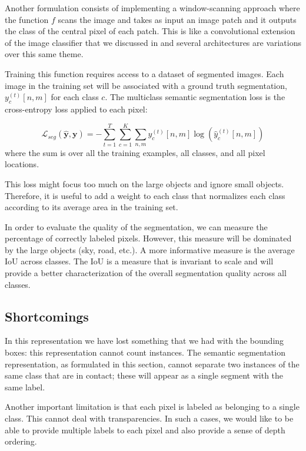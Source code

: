 Another formulation consists of implementing a window-scanning approach where the function $f$ scans the image and takes as input an image patch and it outputs the class of the central pixel of each patch. This is like a convolutional extension of the image classifier that we discussed in \sect{\ref{sec:image_classification}} and several architectures are variations over this same theme. 

Training this function requires access to a dataset of segmented images. Each image in the training set will be associated with a ground truth segmentation, $y^{(t)}_c \left[n,m \right]$ for each class $c$. The multiclass semantic segmentation loss is the cross-entropy loss applied to each pixel:

\begin{equation}
    \mathcal{L}_{seg}(\hat{\mathbf{y}},\mathbf{y})
     = -\sum_{t=1}^{T} \sum_{c=1}^{K} \sum_{n,m}  y^{(t)}_c \left[n,m \right] \log(\hat{y}^{(t)}_c \left[n,m \right])
\end{equation}
where the sum is over all the training examples, all classes, and all pixel locations. 

This loss might focus too much on the large objects and ignore small objects. Therefore, it is useful to add a weight to each class that normalizes each class according to its average area in the training set. 

In order to evaluate the quality of the segmentation, we can measure the percentage of correctly labeled pixels. However, this measure will be dominated by the large objects (sky, road, etc.). A more informative measure is the average IoU across classes. The IoU is a measure that is invariant to scale and will provide a better characterization of the overall segmentation quality across all classes. 

\subsection{Shortcomings}

In this representation we have lost something that we had with the bounding boxes: this representation cannot count instances. The semantic segmentation representation, as formulated in this section, cannot separate two instances of the same class that are in contact; these will appear as a single segment with the same label.

Another important limitation is that each pixel is labeled as belonging to a single class. This cannot deal with transparencies. In such a cases, we would like to be able to provide multiple labels to each pixel and also provide a sense of depth ordering. 


